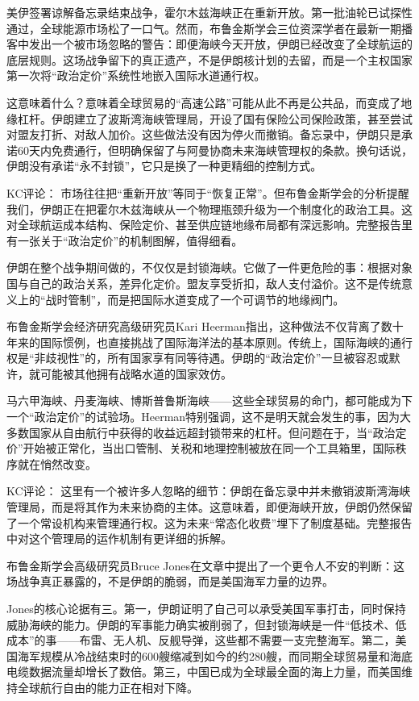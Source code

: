 \documentclass[11pt]{ctexart}
\begin{document}
美伊签署谅解备忘录结束战争，霍尔木兹海峡正在重新开放。第一批油轮已试探性通过，全球能源市场松了一口气。然而，布鲁金斯学会三位资深学者在最新一期播客中发出一个被市场忽略的警告：即便海峡今天开放，伊朗已经改变了全球航运的底层规则。这场战争留下的真正遗产，不是伊朗核计划的去留，而是一个主权国家第一次将“政治定价”系统性地嵌入国际水道通行权。

这意味着什么？意味着全球贸易的“高速公路”可能从此不再是公共品，而变成了地缘杠杆。伊朗建立了波斯湾海峡管理局，开设了国有保险公司保险政策，甚至尝试对盟友打折、对敌人加价。这些做法没有因为停火而撤销。备忘录中，伊朗只是承诺60天内免费通行，但明确保留了与阿曼协商未来海峡管理权的条款。换句话说，伊朗没有承诺“永不封锁”，它只是换了一种更精细的控制方式。

KC评论： 市场往往把“重新开放”等同于“恢复正常”。但布鲁金斯学会的分析提醒我们，伊朗正在把霍尔木兹海峡从一个物理瓶颈升级为一个制度化的政治工具。这对全球航运成本结构、保险定价、甚至供应链地缘布局都有深远影响。完整报告里有一张关于“政治定价”的机制图解，值得细看。

伊朗在整个战争期间做的，不仅仅是封锁海峡。它做了一件更危险的事：根据对象国与自己的政治关系，差异化定价。盟友享受折扣，敌人支付溢价。这不是传统意义上的“战时管制”，而是把国际水道变成了一个可调节的地缘阀门。

布鲁金斯学会经济研究高级研究员Kari Heerman指出，这种做法不仅背离了数十年来的国际惯例，也直接挑战了国际海洋法的基本原则。传统上，国际海峡的通行权是“非歧视性”的，所有国家享有同等待遇。伊朗的“政治定价”一旦被容忍或默许，就可能被其他拥有战略水道的国家效仿。

马六甲海峡、丹麦海峡、博斯普鲁斯海峡——这些全球贸易的命门，都可能成为下一个“政治定价”的试验场。Heerman特别强调，这不是明天就会发生的事，因为大多数国家从自由航行中获得的收益远超封锁带来的杠杆。但问题在于，当“政治定价”开始被正常化，当出口管制、关税和地理控制被放在同一个工具箱里，国际秩序就在悄然改变。

KC评论： 这里有一个被许多人忽略的细节：伊朗在备忘录中并未撤销波斯湾海峡管理局，而是将其作为未来协商的主体。这意味着，即便海峡开放，伊朗仍然保留了一个常设机构来管理通行权。这为未来“常态化收费”埋下了制度基础。完整报告中对这个管理局的运作机制有更详细的拆解。

布鲁金斯学会高级研究员Bruce Jones在文章中提出了一个更令人不安的判断：这场战争真正暴露的，不是伊朗的脆弱，而是美国海军力量的边界。

Jones的核心论据有三。第一，伊朗证明了自己可以承受美国军事打击，同时保持威胁海峡的能力。伊朗的军事能力确实被削弱了，但封锁海峡是一件“低技术、低成本”的事——布雷、无人机、反舰导弹，这些都不需要一支完整海军。第二，美国海军规模从冷战结束时的600艘缩减到如今的约280艘，而同期全球贸易量和海底电缆数据流量却增长了数倍。第三，中国已成为全球最全面的海上力量，而美国维持全球航行自由的能力正在相对下降。
\end{document}

